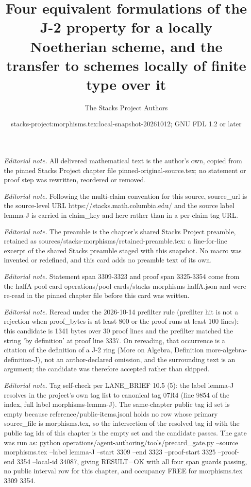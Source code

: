 \documentclass[10pt,a4paper]{amsart}
\title{Four equivalent formulations of the J-2 property for a locally Noetherian scheme, and the transfer to schemes locally of finite type over it}
\author{The Stacks Project Authors}
\date{stacks-project:morphisms.tex:local-snapshot-20261012; GNU FDL 1.2 or later}
\theoremstyle{plain}
\theoremstyle{definition}
\theoremstyle{remark}
\numberwithin{equation}{subsection}
\begin{document}
\maketitle
\noindent\textit{Editorial note.} All delivered mathematical text is the author's own, copied from the pinned Stacks Project chapter file pinned-original-source.tex; no statement or proof step was rewritten, reordered or removed.\par\medskip
\noindent\textit{Editorial note.} Following the multi-claim convention for this source, source\_url is the source-level URL https://stacks.math.columbia.edu/ and the source label lemma-J is carried in claim\_key and here rather than in a per-claim tag URL.\par\medskip
\noindent\textit{Editorial note.} The preamble is the chapter's shared Stacks Project preamble, retained as sources/stacks-morphisms/retained-preamble.tex: a line-for-line excerpt of the shared Stacks preamble staged with this snapshot. No macro was invented or redefined, and this card adds no preamble text of its own.\par\medskip
\noindent\textit{Editorial note.} Statement span 3309-3323 and proof span 3325-3354 come from the halfA pool card operations/pool-cards/stacks-morphisms-halfA.json and were re-read in the pinned chapter file before this card was written.\par\medskip
\noindent\textit{Editorial note.} Reread under the 2026-10-14 prefilter rule (prefilter hit is not a rejection when proof\_bytes is at least 800 or the proof runs at least 100 lines): this candidate is 1341 bytes over 30 proof lines and the prefilter matched the string 'by definition' at proof line 3337. On rereading, that occurrence is a citation of the definition of a J-2 ring (More on Algebra, Definition more-algebra-definition-J), not an author-declared omission, and the surrounding text is an argument; the candidate was therefore accepted rather than skipped.\par\medskip
\noindent\textit{Editorial note.} Tag self-check per LANE\_BRIEF 10.5 (5): the label lemma-J resolves in the project's own tag list to canonical tag 07R4 (line 9854 of the index, full label morphisms-lemma-J). The same-chapter public tag id set is empty because reference/public-items.jsonl holds no row whose primary source\_file is morphisms.tex, so the intersection of the resolved tag id with the public tag ids of this chapter is the empty set and the candidate passes. The gate was run as: python operations/agent-authoring/tools/precard\_gate.py --source morphisms.tex --label lemma-J --start 3309 --end 3323 --proof-start 3325 --proof-end 3354 --local-id 34087, giving RESULT=OK with all four span guards passing, no public interval row for this chapter, and occupancy FREE for morphisms.tex 3309 3354.\par\medskip
\end{document}

